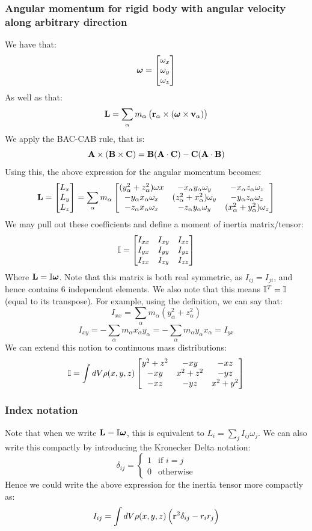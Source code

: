 \documentclass[../PHYS306Notes.tex]{subfiles}
\begin{document}
\subsubsection{Angular momentum for rigid body with angular velocity along arbitrary direction}
We have that:
\[\bm{\omega} = \begin{bmatrix}\omega_x \\ \omega_y \\ \omega_z\end{bmatrix}\]
As well as that:
\[\mathbf{L} = \sum_\alpha m_\alpha \left(\mathbf{r}_\alpha \times (\bm{\omega} \times \mathbf{v}_\alpha)\right)\]
We apply the BAC-CAB rule, that is:
\[\mathbf{A} \times (\mathbf{B} \times \mathbf{C}) = \mathbf{B}(\mathbf{A} \cdot \mathbf{C}) - \mathbf{C}(\mathbf{A} \cdot \mathbf{B})\]
Using this, the above expression for the angular momentum becomes:
\[\mathbf{L} = \begin{bmatrix}L_x \\ L_y \\ L_z\end{bmatrix} = \sum_\alpha m_\alpha \begin{bmatrix}(y_\alpha^2 + z_\alpha^2)\omega x & - x_\alpha y_\alpha \omega_y & -x_\alpha z_\alpha \omega_z
\\ -y_\alpha x_\alpha \omega_x & (z_\alpha^2 + x_\alpha^2)\omega_y & -y_\alpha z_\alpha \omega_z
\\ -z_\alpha x_\alpha \omega_x & -z_\alpha y_\alpha \omega_y & (x_\alpha^2 + y_\alpha^2)\omega_z\end{bmatrix}\]
We may pull out these coefficients and define a moment of inertia matrix/tensor:
\[\mathbb{I} = \begin{bmatrix}I_{xx} & I_{xy} & I_{xz} \\ I_{yx} & I_{yy} & I_{yz} \\ I_{zx} & I_{zy} & I_{zz}\end{bmatrix}\]
Where $\mathbf{L} = \mathbb{I}\bm{\omega}$. Note that this matrix is both real symmetric, as $I_{ij} = I_{ji}$, and hence contains 6 independent elements. We also note that this means $\mathbb{I}^T = \mathbb{I}$ (equal to its transpose). For example, using the definition, we can say that:
\[I_{xx} = \sum_\alpha m_\alpha(y_\alpha^2 + z_\alpha^2)\]
\[I_{xy} = -\sum_\alpha m_\alpha x_\alpha y_\alpha = -\sum_\alpha m_\alpha y_\alpha x_\alpha = I_{yx}\]
We can extend this notion to continuous mass distributions:
\[\mathbb{I} = \int dV\rho(x, y, z)\begin{bmatrix}y^2 + z^2 & -xy & -xz \\ -xy & x^2 + z^2 & -yz \\ -xz & -yz & x^2 + y^2
\end{bmatrix}\]
\subsubsection{Index notation}
Note that when we write $\mathbf{L} = \mathbb{I}\bm{\omega}$, this is equivalent to $L_i = \sum_j I_{ij}\omega_j$. We can also write this compactly by introducing the Kronecker Delta notation:
\[\delta_{ij} = \begin{cases}
1 & \text{if $i = j$}
\\ 0 & \text{otherwise}
\end{cases}\]
Hence we could write the above expression for the inertia tensor more compactly as:
\[I_{ij} = \int dV\rho(x,y,z)\left(\mathbf{r}^2\delta_{ij} - r_ir_j\right)\]
\end{document}

